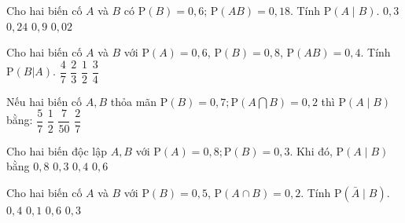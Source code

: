 \begin{ex}%
	Cho hai  biến cố $A$ và $B$ có $\mathrm{P}(B)=0{,}6$; $\mathrm{P}(AB)=0{,}18$. Tính $\mathrm{P}(A \mid B)$.
	\choice 
		{\True $0{,}3$} 
		 {$0{,}24$}
		{$0{,}9$} 
		 {$0{,}02$}
\end{ex}

\begin{ex}%
	Cho  hai biến cố $A$ và $B$ với $\mathrm{P}(A)=0{,}6$, $\mathrm{P}(B)=0{,}8$, $\mathrm{P}(AB)=0{,}4$. Tính $\mathrm{P}(B|A)$.
	 \choice
		 {$\dfrac{4}{7}$}
		 {\True$\dfrac{2}{3}$}
		 {$\dfrac{1}{2}$}
		{$\dfrac{3}{4}$} 
\end{ex}

\begin{ex}%
	Nếu hai biến cố $A,B$ thỏa mãn $\mathrm{P}\left(B\right)=0{,}7;\mathrm{P}\left(A\bigcap B\right)=0{,}2$ thì $\mathrm{P}\left(A\mid  B\right)$ bằng:
	\choice 
		{$\dfrac{5}{7}$} 
		 {$\dfrac{1}{2}$}
		{$\dfrac{7}{50}$} 
		{\True  $\dfrac{2}{7}$}
\end{ex}

\begin{ex}%
	 Cho hai biến độc lập $A,B$ với $\mathrm{P}\left(A\right)=0{,}8; \mathrm{P}\left(B\right)=0{,}3$. Khi đó, $\mathrm{P}\left(A\mid B\right)$ bằng
	\choice 
		{\True $0{,}8$} 
		 {$0{,}3$}
		{$0{,}4$} 
		 {$0{,}6$}
\end{ex}

\begin{ex}%
	Cho  hai biến cố $A$ và $B$ với $\mathrm{P}\left(B\right)=0{,}5$, $\mathrm{P}\left(A\cap B\right)=0{,}2$. Tính $\mathrm{P}\left(\bar{A}\mid B\right)$.
	 \choice
		 {$0{,}4$}
		{$0{,}1$} 
		{\True  $0{,}6$}
		{$0{,}3$} 
\end{ex}

